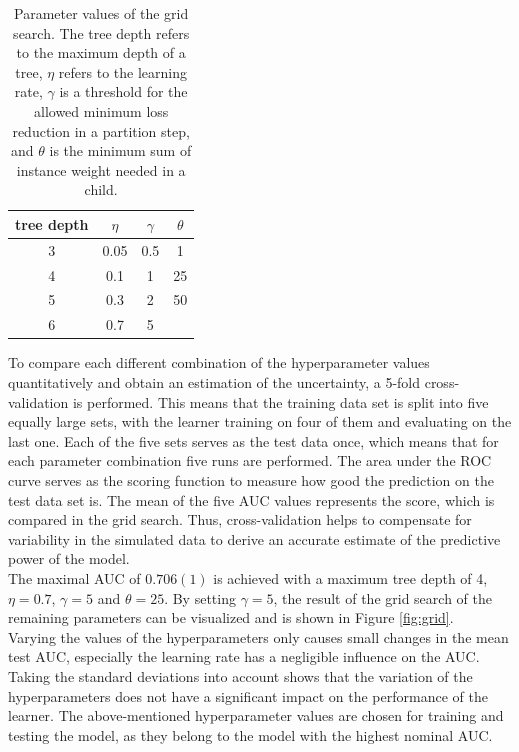   \begin{table}
    \centering
    \caption{Parameter values of the grid search. The tree depth refers to the maximum depth of a tree, $\eta$ refers to the learning rate,
    $\gamma$ is a threshold for the allowed minimum loss reduction in a partition step, and $\theta$ is the minimum sum of instance weight needed in a child.}
    \begin{tabular}{c c c c}
      \toprule
      tree depth & $\eta$ & $\gamma$ & $\theta$ \\
      \midrule
      3 & 0.05 & 0.5 & 1  \\
      4 & 0.1  & 1   & 25  \\
      5 & 0.3  & 2 & 50  \\
      6 & 0.7  & 5   &  \\
    \end{tabular}
    \label{tab:grid}
  \end{table}
To compare each different combination of the hyperparameter values quantitatively and obtain an estimation of the uncertainty, a 5-fold cross-validation is performed. This means that
the training data set is split into five equally
large sets, with the learner training on four of them and evaluating on the last one. Each of the five sets serves as the test data once, which means that for each
parameter combination five runs are performed. The area under the ROC curve serves as the scoring function to measure how good the prediction on the test data set is.
The mean of the five AUC values represents the score, which is compared in the grid search. Thus, cross-validation helps to compensate for variability in the simulated
data to derive an accurate estimate of the predictive power of the model. \\
The maximal AUC of $0.706(1)$ is achieved with a maximum tree depth of 4, $\eta=0.7$, $\gamma=5$ and $\theta=25$. By setting $\gamma=5$, the result of the grid search of the remaining
parameters can be visualized and is shown in Figure \ref{fig:grid}. \\
Varying the values of the hyperparameters only causes small changes in the mean test AUC, especially the learning rate has a negligible influence on the AUC. Taking the
standard deviations into account shows that the variation of the hyperparameters does not have a significant impact on the performance of the learner.
The above-mentioned hyperparameter values are chosen for training and testing the model, as they belong to  the model with the highest nominal AUC.

